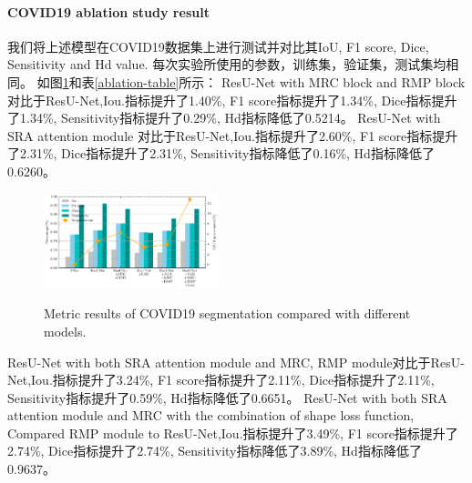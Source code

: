 \documentclass[UTF8]{article} %
\begin{document}
  \paragraph{COVID19 ablation study result}
  我们将上述模型在COVID19数据集上进行测试并对比其IoU, F1 score, Dice, Sensitivity and Hd value. 每次实验所使用的参数，训练集，验证集，测试集均相同。
  如图\ref{fig:covid_comparison}和表\ref{ablation-table}所示：
  ResU-Net with MRC block and RMP block 对比于ResU-Net,Iou.指标提升了1.40\%, F1 score指标提升了1.34\%, Dice指标提升了1.34\%, Sensitivity指标提升了0.29\%, Hd指标降低了0.5214。
  ResU-Net with SRA attention module 对比于ResU-Net,Iou.指标提升了2.60\%, F1 score指标提升了2.31\%, Dice指标提升了2.31\%, Sensitivity指标降低了0.16\%, Hd指标降低了0.6260。
  \begin{figure}[htbp]
    \begin{center}
    \includegraphics[width=0.45\textwidth]{figure/covid_comparison.pdf}
    \vspace{-2mm}
    \caption{Metric results of COVID19 segmentation compared with different models.} 
    \vspace{-2mm}
    \label{fig:covid_comparison}
    \end{center}
    \vspace{-0.35cm}
  \end{figure}
  ResU-Net with both SRA attention module and MRC, RMP module对比于ResU-Net,Iou.指标提升了3.24\%, F1 score指标提升了2.11\%, Dice指标提升了2.11\%, Sensitivity指标提升了0.59\%, Hd指标降低了0.6651。
  ResU-Net with both SRA attention module and MRC with the combination of shape loss function, 
  Compared RMP module to ResU-Net,Iou.指标提升了3.49\%, F1 score指标提升了2.74\%, Dice指标提升了2.74\%, Sensitivity指标降低了3.89\%, Hd指标降低了0.9637。
  
\end{document}
